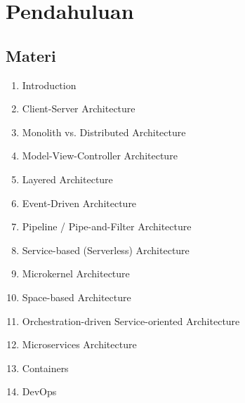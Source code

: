 \chapter{Pendahuluan}

\section{Materi}
\begin{enumerate}
\item Introduction
\item Client-Server Architecture
\item Monolith vs. Distributed Architecture
\item Model-View-Controller Architecture
\item Layered Architecture
\item Event-Driven Architecture
\item Pipeline / Pipe-and-Filter Architecture
\item Service-based (Serverless) Architecture
\item Microkernel Architecture
\item Space-based Architecture
\item Orchestration-driven Service-oriented Architecture
\item Microservices Architecture
\item Containers
\item DevOps
\end{enumerate}


